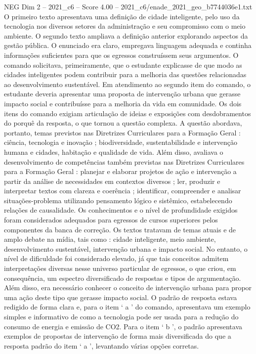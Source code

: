 \begin{textsample}{NEG Dim 2 – 2021\_c6 – Score 4.00 – 2021\_c6/enade\_2021\_geo\_b7744036e1.txt}
O primeiro texto apresentava uma definição de cidade inteligente, pelo uso da tecnologia nos diversos setores da administração e seu compromisso com o meio ambiente.
O segundo texto ampliava a definição anterior explorando aspectos da gestão pública.
O enunciado era claro, empregava linguagem adequada e continha informações suficientes para que os egressos construíssem seus argumentos.
O comando solicitava, primeiramente, que o estudante explicasse de que modo as cidades inteligentes podem contribuir para a melhoria das questões relacionadas ao desenvolvimento sustentável.
Em atendimento ao segundo item do comando, o estudante deveria apresentar uma proposta de intervenção urbana que gerasse impacto social e contribuísse para a melhoria da vida em comunidade.
Os dois itens do comando exigiam articulação de ideias e exposições com desdobramentos do porquê da resposta, o que tornou a questão complexa.
A questão abordava, portanto, temas previstos nas Diretrizes Curriculares para a Formação Geral : ciência, tecnologia e inovação ; biodiversidade, sustentabilidade e intervenção humana e cidades, habitação e qualidade de vida.
Além disso, avaliava o desenvolvimento de competências também previstas nas Diretrizes Curriculares para a Formação Geral : planejar e elaborar projetos de ação e intervenção a partir da análise de necessidades em contextos diversos ; ler, produzir e interpretar textos com clareza e coerência ; identificar, compreender e analisar situações-problema utilizando pensamento lógico e sistêmico, estabelecendo relações de causalidade.
Os conhecimentos e o nível de profundidade exigidos foram considerados adequados para egressos de cursos superiores pelos componentes da banca de correção.
Os textos tratavam de temas atuais e de amplo debate na mídia, tais como : cidade inteligente, meio ambiente, desenvolvimento sustentável, intervenção urbana e impacto social.
No entanto, o nível de dificuldade foi considerado elevado, já que tais conceitos admitem interpretações diversas nesse universo particular de egressos, o que criou, em consequência, um espectro diversificado de respostas e tipos de argumentação.
Além disso, era necessário conhecer o conceito de intervenção urbana para propor uma ação deste tipo que gerasse impacto social.
O padrão de resposta estava redigido de forma clara e, para o item ‘ a ’ do comando, apresentava um exemplo simples e informativo de como a tecnologia pode ser usada para a redução do consumo de energia e emissão de CO2.
Para o item ‘ b ’, o padrão apresentava exemplos de propostas de intervenção de forma mais diversificada do que a resposta padrão do item ‘ a ’, levantando várias opções corretas.

\end{textsample}
